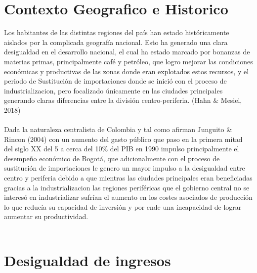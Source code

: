 \documentclass[12pt,letterpaper]{article}
\begin{document}
\section{Contexto Geografico e Historico}

\begin{flushleft}

Los habitantes de las distintas regiones del país han estado históricamente aislados por la complicada geografía nacional. Esto ha generado una clara desigualdad en el desarrollo nacional, 
el cual ha estado marcado por bonanzas de materias primas, principalmente café y petróleo, que logro mejorar las condiciones económicas y productivas de las zonas donde eran explotados estos recursos, y el periodo de
Sustitución de importaciones donde se inició con el proceso de industrializacion, pero focalizado únicamente en las ciudades principales generando claras diferencias entre la división centro-periferia. (Hahn \& Mesiel, 2018) \\
~\\
Dada la naturaleza centralista de Colombia y tal como afirman Junguito \& Rincon (2004) con un aumento del gasto público que paso en la primera mitad del siglo XX del 5 a cerca del 10\% del PIB en 1990 impulso
principalmente el desempeño económico de Bogotá, que adicionalmente con el proceso de sustitución de importaciones le genero un mayor impulso a la desigualdad entre centro y periferia debido a que
mientras las ciudades principales eran beneficiadas gracias a la industrializacion las regiones periféricas que el gobierno central no se interesó en industrializar sufrían el aumento en los costes asociados de producción lo que reducía su capacidad de inversión
y por ende una incapacidad de lograr aumentar su productividad.\\
~\\

\end{flushleft}

\newpage

\section{Desigualdad de ingresos}
\end{document}
